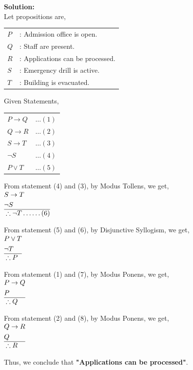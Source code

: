 \textbf{Solution:}\\[1em]
Let propositions are,\\
\begin{tabular}{ll}
   $P$ &: Admission office is open. \\
   $Q$ &: Staff are present. \\
   $R$ &: Applications can be processed. \\
   $S$ &: Emergency drill is active. \\
   $T$ &: Building is evacuated. \\
\end{tabular}

Given Statements,\\
\begin{tabular}{ll}
   $P \to Q$ & $\ldots (1)$\\
   $Q \to R$ & $\ldots (2)$\\
   $S \to T$ & $\ldots (3)$\\
   $\neg S$ & $\ldots (4)$\\
   $P \lor T$ & $\ldots (5)$\\
\end{tabular}


From statement (4) and (3), by Modus Tollens, we get,\\
$\begin{aligned}
   & S \to T \\
   & \neg S \\\hline
   & \therefore \neg T \ldots\ldots (6) \\
\end{aligned}$

From statement (5) and (6), by Disjunctive Syllogism, we get,\\
$\begin{aligned}
   & P \lor T \\
   & \neg T \\\hline
   & \therefore P \\
\end{aligned}$

From statement (1) and (7), by Modus Ponens, we get,\\
$\begin{aligned}
   & P \to Q \\
   & P \\\hline
   & \therefore Q \\
\end{aligned}$

From statement (2) and (8), by Modus Ponens, we get,\\
$\begin{aligned}
   & Q \to R \\
   & Q \\\hline
   & \therefore R \\
\end{aligned}$

Thus, we conclude that \textbf{"Applications can be processed"}.